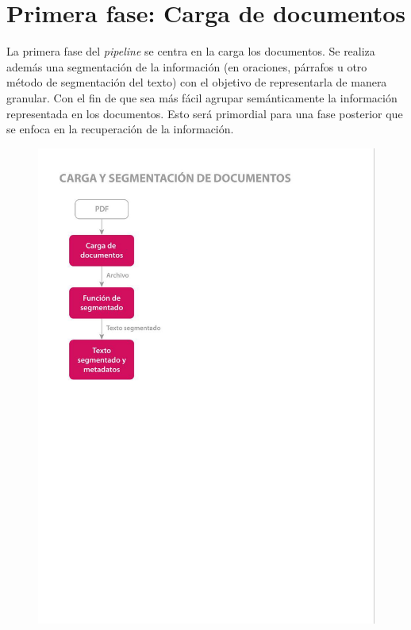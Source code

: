     \section{Primera fase: Carga de documentos} 
    La primera fase del \emph{pipeline} se centra en la carga los documentos. Se realiza además una segmentación de la información (en oraciones, párrafos u otro método de segmentación del texto) con el objetivo de representarla de manera granular. Con el fin de que sea más fácil agrupar semánticamente la información representada en los documentos. Esto será primordial para una fase posterior que se enfoca en la recuperación de la información.

    \begin{figure}[H]    
        \centering
        \includegraphics[scale = 1]{Figures/pipeline_1.jpg}
        \caption*{}
    \end{figure}
    
